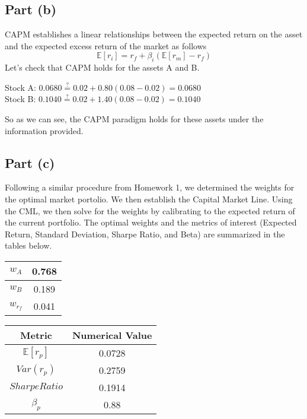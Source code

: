 \documentclass[12pt]{article}
\begin{document}
	\subsection{Part (b)}
	
		CAPM establishes a linear relationships between the expected return on the asset and the expected excess return of the market as follows
		$$ \mathbb{E}[r_{i}] = r_{f} + \beta_{i}(\mathbb{E}[r_{m}] - r_{f}) $$
		Let's check that CAPM holds for the assets A and B.\\
		\begin{center}
		Stock A: $0.0680 \stackrel{?}{=} 0.02 + 0.80(0.08-0.02) = 0.0680$ \\ 
		Stock B: $0.1040 \stackrel{?}{=} 0.02 + 1.40(0.08-0.02) = 0.1040$
		\end{center}
		So as we can see, the CAPM paradigm holds for these assets under the information provided. 
		
	\subsection{Part (c)}
	
		Following a similar procedure from Homework 1, we determined the weights for the optimal market portolio. We then establish the Capital Market Line. 
		Using the CML, we then solve for the weights by calibrating to the expected return of the current portfolio. The optimal weights and the metrics of 
		interest (Expected Return, Standard Deviation, Sharpe Ratio, and Beta) are summarized in the tables below.
		\begin{center}
 		\begin{tabular}{||c c||} 
 		\hline
 		$w_{A}$ & 0.768	 \\ 
 		\hline
 		$w_{B}$ & 0.189\\
 		\hline
 		$w_{r_{f}}$ & 0.041  \\
 		\hline
		\end{tabular}
		\end{center}
		\begin{center}
 		\begin{tabular}{||c c||} 
 		\hline
 		 Metric & Numerical Value \\ [0.5ex] 
 		\hline \hline
 		$\mathbb{E}[r_{p}]$ & 0.0728 \\ 
 		\hline
 		$Var(r_{p})$ & 0.2759 \\
 		\hline
 		$Sharpe Ratio$ & 0.1914  \\
 		\hline
 		$\beta_{p}$ & 0.88  \\
 		\hline
		\end{tabular}
		\end{center}
		
\end{document}
